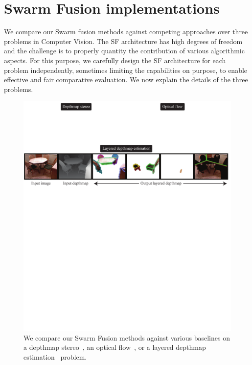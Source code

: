 \section{Swarm Fusion implementations}
We compare our Swarm fusion methods against competing approaches over three
problems in Computer Vision. The SF architecture has high degrees of
freedom and the challenge is to properly quantity the contribution of
various algorithmic aspects. For this purpose, we carefully design the
SF architecture for each problem independently, sometimes limiting the
capabilities on purpose, to enable effective and fair comparative evaluation.
We now explain the details of the three problems.

%
\begin{figure}[tb]
 \includegraphics[width=\columnwidth]{figure/problem.pdf} \caption{We
 compare our Swarm Fusion methods against various baselines on a
 depthmap stereo~\cite{middle_bury_stereo}, an optical
 flow~\cite{middlebury_optical_flow}, or a layered depthmap
 estimation~\cite{layered_depthmap} problem.  }\label{fig:problem}
\end{figure}



